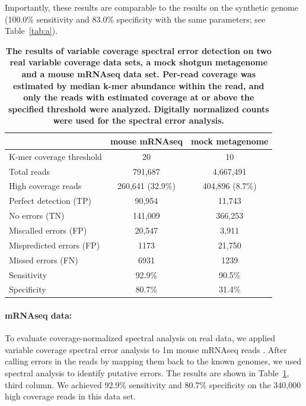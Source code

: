 \documentclass{article}
\begin{document}
Importantly, these results are comparable to the results on the
synthetic genome (100.0\% sensitivity and 83.0\% specificity with the
same parameters; see Table~\ref{tab:a}).


\begin{table}
\begin{tabular}{|l|c||c|}
\hline
& {\bf mouse mRNAseq} & {\bf mock metagenome} \\
\hline
K-mer coverage threshold   & 20              & 10              \\
Total reads                & 791,687         & 4,667,491       \\
High coverage reads        & 260,641 (32.9\%) & 404,896 (8.7\%) \\
\hline
Perfect detection (TP)     & 90,954          & 11,743          \\
No errors (TN)             & 141,009         & 366,253         \\
Miscalled errors (FP)      & 20,547          & 3,911           \\
Mispredicted errors (FP)   & 1173            & 21,750          \\
Missed errors (FN)         & 6931            & 1239            \\
\hline
Sensitivity                & 92.9\%          & 90.5\%          \\
Specificity                & 80.7\%          & 31.4\%          \\
\hline
\end{tabular}

\caption{{\bf The results of variable coverage spectral error detection on
  two real variable coverage data sets, a mock shotgun metagenome and
  a mouse mRNAseq data set. Per-read coverage was estimated by median
  k-mer abundance within the read, and only the reads with estimated
  coverage at or above the specified threshold were analyzed.
  Digitally normalized counts were used for the spectral error analysis.}}
\label{tab:spectra_variable_real}

\end{table}

\paragraph{mRNAseq data:}


To evaluate coverage-normalized spectral analysis on real data, we
applied variable coverage spectral error analysis to 1m mouse mRNAseq
reads \cite{Haas2013}.  After calling errors in the reads by mapping
them back to the known genomes, we used spectral analysis to identify
putative errors.  The results are shown in
Table~\ref{tab:spectra_variable_real}, third column.  We achieved
92.9\% sensitivity and 80.7\% specificity on the 340,000 high coverage
reads in this data set.
\end{document}
